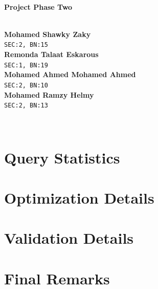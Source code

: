 \documentclass[a4paper,12pt]{article}
\begin{document}
\begin{titlepage}

\HRule \\[0.4cm]
{ \huge \bfseries Project Phase Two}\\[0.4cm] %
\HRule \\[1cm]
 
\begin{minipage}{0.8\textwidth}
\begin{flushleft} 
\textbf{Mohamed Shawky Zaky} \\
\texttt{SEC:2, BN:15} \\[0.5cm]

\textbf{Remonda Talaat Eskarous} \\
\texttt{SEC:1, BN:19} \\[0.5cm]

\textbf{Mohamed Ahmed Mohamed Ahmed} \\
\texttt{SEC:2, BN:10} \\[0.5cm]

\textbf{Mohamed Ramzy Helmy} \\
\texttt{SEC:2, BN:13}

\end{flushleft}
\end{minipage}\\[6cm]

\end{titlepage}

\thispagestyle{empty}

\tableofcontents
\listoffigures
\clearpage


\section{Query Statistics}


\newpage

\section{Optimization Details}


\newpage

\section{Validation Details}


\newpage

\section{Final Remarks}

\end{document}

